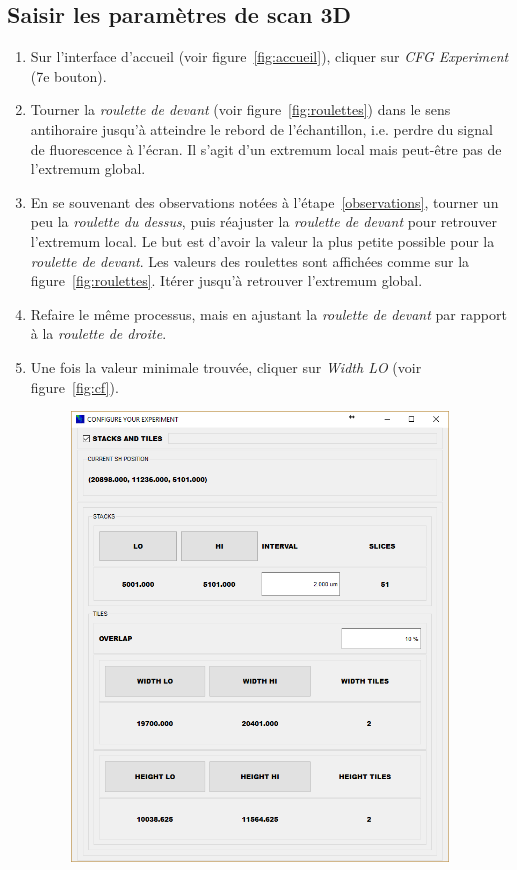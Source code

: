 \subsection{Saisir les paramètres de scan 3D}
\begin{enumerate}
    
    \item Sur l'interface d'accueil (voir figure~\ref{fig:accueil}), cliquer sur \textit{CFG Experiment} (7e bouton).
    \item \label{extremums1} Tourner la \textit{roulette de devant} (voir figure~\ref{fig:roulettes}) dans le sens antihoraire jusqu'à atteindre le rebord de l'échantillon, i.e. perdre du signal de fluorescence à l'écran. Il s'agit d'un extremum local mais peut-être pas de l'extremum global.
    \item En se souvenant des observations notées à l'étape~\ref{observations}, tourner un peu la \textit{roulette du dessus}, puis réajuster la \textit{roulette de devant} pour retrouver l'extremum local. Le but est d'avoir la valeur la plus petite possible pour la \textit{roulette de devant}. Les valeurs des roulettes sont affichées comme sur la figure~\ref{fig:roulettes}. Itérer jusqu'à retrouver l'extremum global.
    \item Refaire le même processus, mais en ajustant la \textit{roulette de devant} par rapport à la \textit{roulette de droite}.
    \item \label{extremums2} Une fois la valeur minimale trouvée, cliquer sur \textit{Width LO} (voir figure~\ref{fig:cf}).
        \begin{figure}[H]
        \centering
        \includegraphics[width=10cm]{cf.png}

\end{figure}
\end{enumerate}
